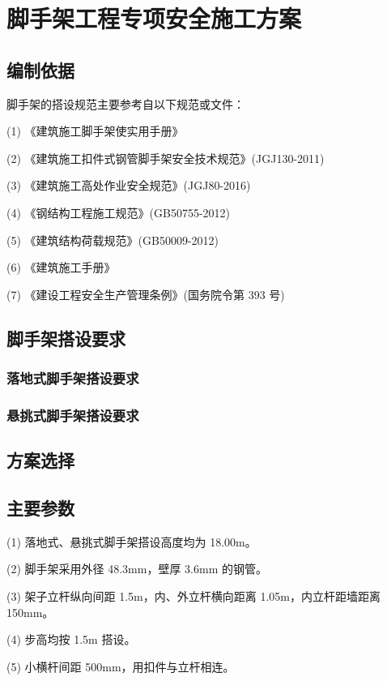 \section{脚手架工程专项安全施工方案}
\subsection{编制依据}

脚手架的搭设规范主要参考自以下规范或文件：

(1) 《建筑施工脚手架使实用手册》

(2) 《建筑施工扣件式钢管脚手架安全技术规范》(JGJ130-2011)

(3) 《建筑施工高处作业安全规范》(JGJ80-2016)

(4) 《钢结构工程施工规范》(GB50755-2012)

(5) 《建筑结构荷载规范》(GB50009-2012)

(6) 《建筑施工手册》

(7) 《建设工程安全生产管理条例》(国务院令第 393 号)

\subsection{脚手架搭设要求}
\subsubsection{落地式脚手架搭设要求}

\subsubsection{悬挑式脚手架搭设要求}

\subsection{方案选择}

\subsection{主要参数}

(1) 落地式、悬挑式脚手架搭设高度均为 18.00m。

(2) 脚手架采用外径 48.3mm，壁厚 3.6mm 的钢管。

(3) 架子立杆纵向间距 1.5m，内、外立杆横向距离 1.05m，内立杆距墙距离 150mm。

(4) 步高均按 1.5m 搭设。

(5) 小横杆间距 500mm，用扣件与立杆相连。


